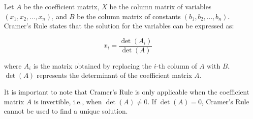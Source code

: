 \documentclass[11pt]{article}
\begin{document}
Let $A$ be the coefficient matrix, $X$ be the column matrix of variables $(x_1, x_2, \ldots, x_n)$, and $B$ be the column matrix of constants $(b_1, b_2, \ldots, b_n)$. Cramer's Rule states that the solution for the variables can be expressed as:

\[
x_i = \frac{{\det(A_i)}}{{\det(A)}}
\]

where $A_i$ is the matrix obtained by replacing the $i$-th column of $A$ with $B$. $\det(A)$ represents the determinant of the coefficient matrix $A$.

It is important to note that Cramer's Rule is only applicable when the coefficient matrix $A$ is invertible, i.e., when $\det(A) \neq 0$. If $\det(A) = 0$, Cramer's Rule cannot be used to find a unique solution.
\end{document}
